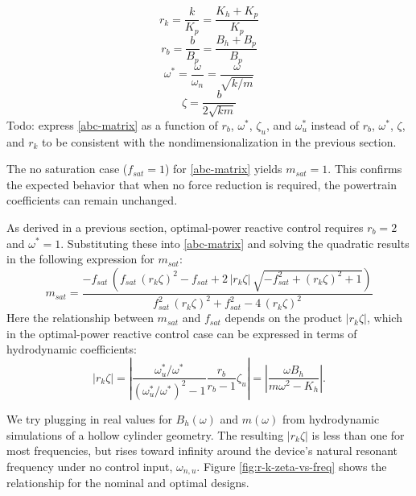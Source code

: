 \documentclass{ifacconf}
\begin{document}
\begin{equation}
    r_k = \frac{k}{K_p} = \frac{K_h+K_p}{K_p}
\end{equation}
\begin{equation}
    r_b = \frac{b}{B_p} = \frac{B_h+B_p}{B_p}
\end{equation}
\begin{equation}
    \omega^* = \frac{\omega}{\omega_n} = \frac{\omega}{\sqrt{k/m}}
\end{equation}
\begin{equation}
    \zeta = \frac{b}{2\sqrt{km}}
\end{equation}
Todo: express \eqref{abc-matrix} as a function of $r_b$, $\omega^*$, $\zeta_u$, and $\omega_u^*$ instead of $r_b$, $\omega^*$, $\zeta$, and $r_k$ to be consistent with the nondimensionalization in the previous section.

The no saturation case ($f_{sat} = 1$) for \eqref{abc-matrix} yields $m_{sat}=1$. This confirms the expected behavior that when no force reduction is required, the powertrain coefficients can remain unchanged.

As derived in a previous section, optimal-power reactive control requires $r_b = 2$ and $\omega^* = 1$. Substituting these into \eqref{abc-matrix} and solving the quadratic results in the following expression for $m_{sat}$:
\begin{equation}\label{eq:m-sat}
    m_{sat} = \frac{-f_{sat}\,\left(f_{sat}\,{(r_k \zeta)}^2-f_{sat}+2\,\left|r_k \zeta\right|\,\sqrt{-f_{sat}^2+{(r_k \zeta)}^2+1}\right)}{f_{sat}^2\,{(r_k \zeta)}^2+f_{sat}^2-4\,{(r_k \zeta)}^2}
\end{equation}
Here the relationship between $m_{sat}$ and $f_{sat}$ depends on the product $|r_k \zeta|$, which in the optimal-power reactive control case can be expressed in terms of hydrodynamic coefficients:
\begin{equation}
    |r_k \zeta| = \left| \frac{\omega^*_u/\omega^*}{(\omega^*_u/\omega^*)^2 - 1} \frac{r_b}{r_b - 1} \zeta_u \right| = \left|\frac{\omega B_h} {m \omega^2 - K_h}\right|.
\end{equation}

We try plugging in real values for $B_h(\omega)$ and $m(\omega)$ from hydrodynamic simulations of a hollow cylinder geometry. The resulting $|r_k \zeta|$ is less than one for most frequencies, but rises toward infinity around the device's natural resonant frequency under no control input, $\omega_{n,u}$. Figure \ref{fig:r-k-zeta-vs-freq} shows the relationship for the nominal and optimal designs. 
\end{document}

